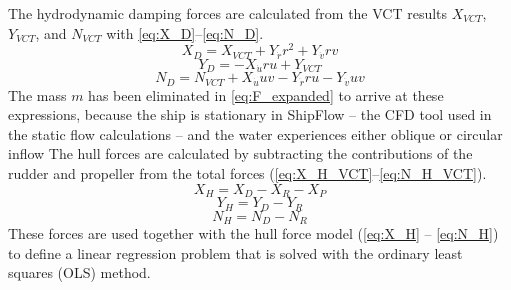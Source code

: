 The hydrodynamic damping forces are calculated from the VCT results $X_{VCT}$, $Y_{VCT}$, and $N_{VCT}$
with \autoref{eq:X_D}--\autoref{eq:N_D}.
\begin{equation}
    \label{eq:X_D}
    X_{D} = X_{VCT} + Y_{\dot{r}} r^{2} + Y_{\dot{v}} r v
\end{equation}
\begin{equation}
    \label{eq:Y_D}
    Y_{D} = - X_{\dot{u}} r u + Y_{VCT}
\end{equation}
\begin{equation}
    \label{eq:N_D}
    N_{D} = N_{VCT} + X_{\dot{u}} u v - Y_{\dot{r}} r u - Y_{\dot{v}} u v
\end{equation}
The mass $m$ has been eliminated in \autoref{eq:F_expanded} to arrive at these expressions, because the ship is stationary in ShipFlow -- the CFD tool used in the static flow calculations -- and the water experiences either oblique or circular inflow \cite{roychoudhuryCFDSimulationsSteady2017}
The hull forces are calculated by subtracting the contributions of the rudder and propeller from the total forces (\autoref{eq:X_H_VCT}--\autoref{eq:N_H_VCT}).
\begin{equation}
    \label{eq:X_H_VCT}
    X_H = X_D - X_R - X_P
\end{equation}
\begin{equation}
    \label{eq:Y_H_VCT}
    Y_H = Y_D - Y_R
\end{equation}
\begin{equation}
    \label{eq:N_H_VCT}
    N_H = N_D - N_R
\end{equation}
These forces are used together with the hull force model (\autoref{eq:X_H} -- \autoref{eq:N_H}) to define a linear regression problem that is solved with the ordinary least squares (OLS) method. 